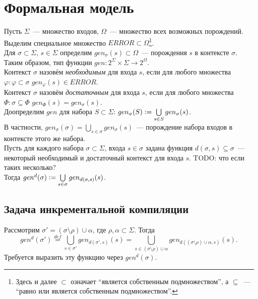 \newpage
\tableofcontents

\section{Формальная модель}

Пусть $\Sigma$~--- множество входов, $\Omega$~--- множество всех возможных порождений. Выделим специальное множество $ERROR \subset \Omega$\footnote{Здесь и далее $\subset$ означает ``является собственным подмножеством'', а $\subseteq$~--- ``равно или является собственным подмножеством''.}.\\
Для $\sigma \subset \Sigma$, $s \in \Sigma$ определим $gen_\sigma(s) \subset \Omega$~--- порождения $s$ в контексте $\sigma$. Таким образом, тип функции $gen: 2^\Sigma \times \Sigma \to 2^\Omega$.\\
Контекст $\sigma$ назовём \textit{необходимым} для входа $s$, если для любого множества $\varphi: \varphi \subset \sigma$ $gen_\varphi(s) \in ERROR$.\\
Контекст $\sigma$ назовём \textit{достаточным} для входа $s$, если для любого множества $\Phi: \sigma \subseteq \Phi$ $gen_\Phi(s) = gen_\sigma(s)$.\\
Доопределим $gen$ для набора $S \subset \Sigma$: $gen_\sigma(S) \vcentcolon= \bigcup\limits_{s \in S} gen_\sigma(s)$.\\
В частности, $gen_\sigma(\sigma) = \bigcup\limits_{s \in \sigma} gen_\sigma(s)$~--- порождение набора входов в контексте этого же набора.\\
Пусть для каждого набора $\sigma \subset \Sigma$, входа $s \in \sigma$ задана функция $d(\sigma, s) \subseteq \sigma$~--- некоторый необходимый и достаточный контекст для входа $s$. TODO: что если таких несколько?\\
Тогда $gen^d(\sigma) \vcentcolon= \bigcup\limits_{s \in \sigma} gen_{d(\sigma, s)}(s)$.

\subsection{Задача инкрементальной компиляции}

Рассмотрим $\sigma' = (\sigma \setminus \rho) \cup \alpha$, где $\rho, \alpha \subset \Sigma$. Тогда
$$gen^d(\sigma') \overset{def}{=} \bigcup\limits_{s \in \sigma'} gen_{d(\sigma', s)}(s) = \bigcup\limits_{s \in (\sigma \setminus \rho) \cup \alpha} gen_{d((\sigma \setminus \rho) \cup \alpha, s)}(s).$$
Требуется выразить эту функцию через $gen^d(\sigma)$.

